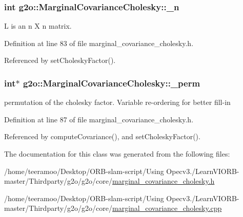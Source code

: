 \subsubsection[{\texorpdfstring{\+\_\+n}{_n}}]{\setlength{\rightskip}{0pt plus 5cm}int g2o\+::\+Marginal\+Covariance\+Cholesky\+::\+\_\+n\hspace{0.3cm}{\ttfamily [protected]}}\hypertarget{classg2o_1_1MarginalCovarianceCholesky_a086c541bde9958af88146788a9ac2611}{}\label{classg2o_1_1MarginalCovarianceCholesky_a086c541bde9958af88146788a9ac2611}


L is an n X n matrix. 



Definition at line 83 of file marginal\+\_\+covariance\+\_\+cholesky.\+h.



Referenced by set\+Cholesky\+Factor().

\subsubsection[{\texorpdfstring{\+\_\+perm}{_perm}}]{\setlength{\rightskip}{0pt plus 5cm}int$\ast$ g2o\+::\+Marginal\+Covariance\+Cholesky\+::\+\_\+perm\hspace{0.3cm}{\ttfamily [protected]}}\hypertarget{classg2o_1_1MarginalCovarianceCholesky_a404f5d0ce82c2877324bafb8997b96aa}{}\label{classg2o_1_1MarginalCovarianceCholesky_a404f5d0ce82c2877324bafb8997b96aa}


permutation of the cholesky factor. Variable re-\/ordering for better fill-\/in 



Definition at line 87 of file marginal\+\_\+covariance\+\_\+cholesky.\+h.



Referenced by compute\+Covariance(), and set\+Cholesky\+Factor().



The documentation for this class was generated from the following files\+:\begin{DoxyCompactItemize}
\item 
/home/teeramoo/\+Desktop/\+O\+R\+B-\/slam-\/script/\+Using Opecv3./\+Learn\+V\+I\+O\+R\+B-\/master/\+Thirdparty/g2o/g2o/core/\hyperlink{marginal__covariance__cholesky_8h}{marginal\+\_\+covariance\+\_\+cholesky.\+h}\item 
/home/teeramoo/\+Desktop/\+O\+R\+B-\/slam-\/script/\+Using Opecv3./\+Learn\+V\+I\+O\+R\+B-\/master/\+Thirdparty/g2o/g2o/core/\hyperlink{marginal__covariance__cholesky_8cpp}{marginal\+\_\+covariance\+\_\+cholesky.\+cpp}\end{DoxyCompactItemize}
